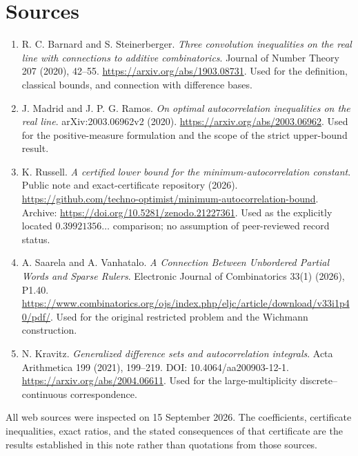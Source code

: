 \documentclass[11pt,a4paper]{article}
\theoremstyle{remark}\newtheorem{remark}[theorem]{Remark}
\begin{document}
\section*{Sources}
\small\raggedright
\begin{enumerate}[leftmargin=*]
\item R. C. Barnard and S. Steinerberger. \emph{Three convolution inequalities on the real line with connections to additive combinatorics}. Journal of Number Theory 207 (2020), 42--55. \url{https://arxiv.org/abs/1903.08731}. Used for the definition, classical bounds, and connection with difference bases.
\item J. Madrid and J. P. G. Ramos. \emph{On optimal autocorrelation inequalities on the real line}. arXiv:2003.06962v2 (2020). \url{https://arxiv.org/abs/2003.06962}. Used for the positive-measure formulation and the scope of the strict upper-bound result.
\item K. Russell. \emph{A certified lower bound for the minimum-autocorrelation constant}. Public note and exact-certificate repository (2026). \url{https://github.com/techno-optimist/minimum-autocorrelation-bound}. Archive: \url{https://doi.org/10.5281/zenodo.21227361}. Used as the explicitly located $0.39921356\ldots$ comparison; no assumption of peer-reviewed record status.
\item A. Saarela and A. Vanhatalo. \emph{A Connection Between Unbordered Partial Words and Sparse Rulers}. Electronic Journal of Combinatorics 33(1) (2026), P1.40. \url{https://www.combinatorics.org/ojs/index.php/eljc/article/download/v33i1p40/pdf/}. Used for the original restricted problem and the Wichmann construction.
\item N. Kravitz. \emph{Generalized difference sets and autocorrelation integrals}. Acta Arithmetica 199 (2021), 199--219. DOI: 10.4064/aa200903-12-1. \url{https://arxiv.org/abs/2004.06611}. Used for the large-multiplicity discrete--continuous correspondence.
\end{enumerate}
All web sources were inspected on 15 September 2026. The coefficients, certificate inequalities, exact ratios, and the stated consequences of that certificate are the results established in this note rather than quotations from those sources.
\end{document}
